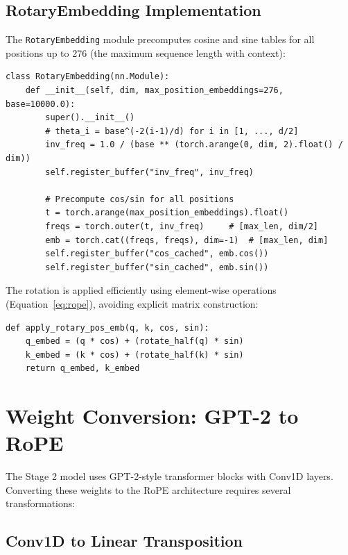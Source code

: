 \documentclass[11pt, a4paper]{article}
\begin{document}
\subsection{RotaryEmbedding Implementation}

The \texttt{RotaryEmbedding} module precomputes cosine and sine tables for all positions up to 276 (the maximum sequence length with context):

\begin{lstlisting}[style=pythonstyle, caption={RotaryEmbedding initialization}]
class RotaryEmbedding(nn.Module):
    def __init__(self, dim, max_position_embeddings=276, base=10000.0):
        super().__init__()
        # theta_i = base^(-2(i-1)/d) for i in [1, ..., d/2]
        inv_freq = 1.0 / (base ** (torch.arange(0, dim, 2).float() / dim))
        self.register_buffer("inv_freq", inv_freq)

        # Precompute cos/sin for all positions
        t = torch.arange(max_position_embeddings).float()
        freqs = torch.outer(t, inv_freq)     # [max_len, dim/2]
        emb = torch.cat((freqs, freqs), dim=-1)  # [max_len, dim]
        self.register_buffer("cos_cached", emb.cos())
        self.register_buffer("sin_cached", emb.sin())
\end{lstlisting}

The rotation is applied efficiently using element-wise operations (Equation~\ref{eq:rope}), avoiding explicit matrix construction:

\begin{lstlisting}[style=pythonstyle, caption={Applying RoPE to query and key tensors}]
def apply_rotary_pos_emb(q, k, cos, sin):
    q_embed = (q * cos) + (rotate_half(q) * sin)
    k_embed = (k * cos) + (rotate_half(k) * sin)
    return q_embed, k_embed
\end{lstlisting}

\section{Weight Conversion: GPT-2 to RoPE}

The Stage 2 model uses GPT-2-style transformer blocks with Conv1D layers. Converting these weights to the RoPE architecture requires several transformations:

\subsection{Conv1D to Linear Transposition}
\end{document}
